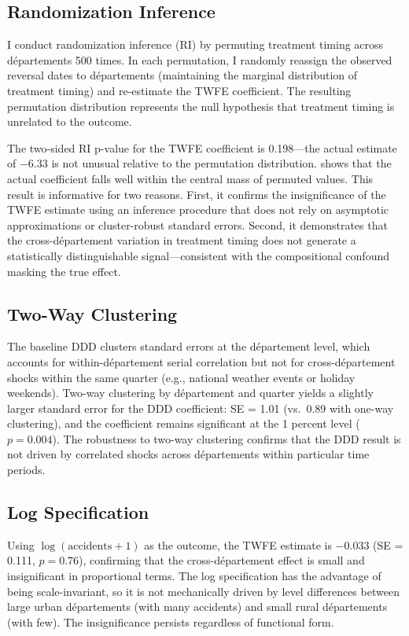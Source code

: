\documentclass[12pt]{article}
\begin{document}
\subsection{Randomization Inference}

I conduct randomization inference (RI) by permuting treatment timing across d\'{e}partements 500 times. In each permutation, I randomly reassign the observed reversal dates to d\'{e}partements (maintaining the marginal distribution of treatment timing) and re-estimate the TWFE coefficient. The resulting permutation distribution represents the null hypothesis that treatment timing is unrelated to the outcome.

The two-sided RI p-value for the TWFE coefficient is 0.198---the actual estimate of $-6.33$ is not unusual relative to the permutation distribution.  shows that the actual coefficient falls well within the central mass of permuted values. This result is informative for two reasons. First, it confirms the insignificance of the TWFE estimate using an inference procedure that does not rely on asymptotic approximations or cluster-robust standard errors. Second, it demonstrates that the cross-d\'{e}partement variation in treatment timing does not generate a statistically distinguishable signal---consistent with the compositional confound masking the true effect.

\subsection{Two-Way Clustering}

The baseline DDD clusters standard errors at the d\'{e}partement level, which accounts for within-d\'{e}partement serial correlation but not for cross-d\'{e}partement shocks within the same quarter (e.g., national weather events or holiday weekends). Two-way clustering by d\'{e}partement and quarter yields a slightly larger standard error for the DDD coefficient: SE = 1.01 (vs.\ 0.89 with one-way clustering), and the coefficient remains significant at the 1 percent level ($p = 0.004$). The robustness to two-way clustering confirms that the DDD result is not driven by correlated shocks across d\'{e}partements within particular time periods.

\subsection{Log Specification}

Using $\log(\text{accidents} + 1)$ as the outcome, the TWFE estimate is $-0.033$ (SE = 0.111, $p = 0.76$), confirming that the cross-d\'{e}partement effect is small and insignificant in proportional terms. The log specification has the advantage of being scale-invariant, so it is not mechanically driven by level differences between large urban d\'{e}partements (with many accidents) and small rural d\'{e}partements (with few). The insignificance persists regardless of functional form.
\end{document}

